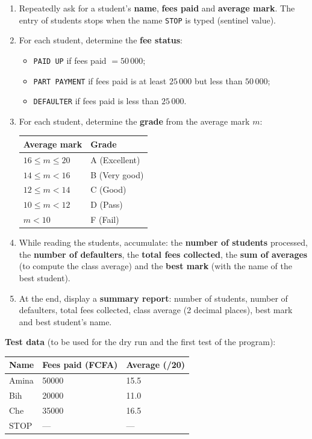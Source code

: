 \documentclass[11pt]{article}
\begin{document}
\begin{enumerate}
\item Repeatedly ask for a student's \textbf{name}, \textbf{fees paid} and \textbf{average mark}. The entry of students stops when the name \texttt{STOP} is typed (sentinel value).
\item For each student, determine the \textbf{fee status}:
\begin{itemize}
\item \texttt{PAID UP} if fees paid $= 50\,000$;
\item \texttt{PART PAYMENT} if fees paid is at least $25\,000$ but less than $50\,000$;
\item \texttt{DEFAULTER} if fees paid is less than $25\,000$.
\end{itemize}
\item For each student, determine the \textbf{grade} from the average mark $m$:
\begin{center}
\begin{tabularx}{\linewidth}{|l|X|}
\hline
\rowcolor{popblueL} \textbf{Average mark} & \textbf{Grade} \\
\hline
$16 \le m \le 20$ & A (Excellent) \\
\hline
$14 \le m < 16$ & B (Very good) \\
\hline
$12 \le m < 14$ & C (Good) \\
\hline
$10 \le m < 12$ & D (Pass) \\
\hline
$m < 10$ & F (Fail) \\
\hline
\end{tabularx}
\end{center}
\item While reading the students, accumulate: the \textbf{number of students} processed, the \textbf{number of defaulters}, the \textbf{total fees collected}, the \textbf{sum of averages} (to compute the class average) and the \textbf{best mark} (with the name of the best student).
\item At the end, display a \textbf{summary report}: number of students, number of defaulters, total fees collected, class average (2 decimal places), best mark and best student's name.
\end{enumerate}

\textbf{Test data} (to be used for the dry run and the first test of the program):

\begin{center}
\begin{tabularx}{\linewidth}{|l|X|X|}
\hline
\rowcolor{popblueL} \textbf{Name} & \textbf{Fees paid (FCFA)} & \textbf{Average (/20)} \\
\hline
Amina & 50000 & 15.5 \\
\hline
Bih & 20000 & 11.0 \\
\hline
Che & 35000 & 16.5 \\
\hline
STOP & --- & --- \\
\hline
\end{tabularx}
\end{center}
\end{document}
